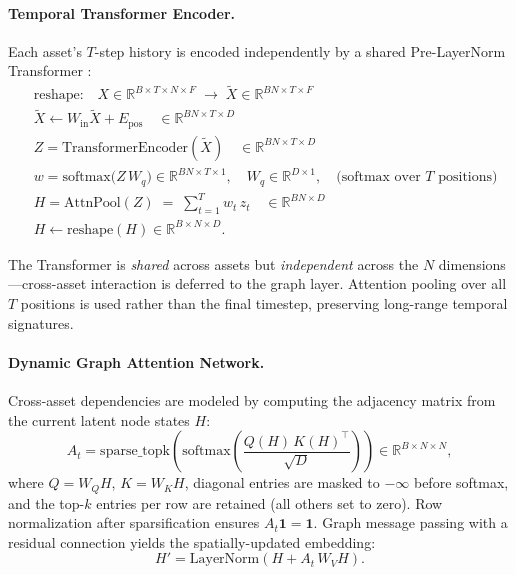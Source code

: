 \documentclass[11pt,a4paper]{article}
\begin{document}
\paragraph{Temporal Transformer Encoder.}
Each asset's $T$-step history is encoded independently by a shared
Pre-LayerNorm Transformer \citep{xiong2020prenorm}:
\begin{align}
  &\text{reshape:}\quad X \in \mathbb{R}^{B \times T \times N \times F}
    \;\to\; \tilde{X} \in \mathbb{R}^{BN \times T \times F}\\
  &\tilde{X} \gets W_{\mathrm{in}}\tilde{X} + E_{\mathrm{pos}}
    \quad \in \mathbb{R}^{BN \times T \times D}\\
  &Z = \mathrm{TransformerEncoder}(\tilde{X})
    \quad \in \mathbb{R}^{BN \times T \times D}\\
  &w = \mathrm{softmax}\!\bigl(Z\,W_q\bigr) \in \mathbb{R}^{BN \times T \times 1},
    \quad W_q \in \mathbb{R}^{D \times 1},\quad \text{(softmax over }T\text{ positions)}\\
  &H = \mathrm{AttnPool}(Z) \;=\; \sum_{t=1}^{T} w_t\, z_t
    \quad \in \mathbb{R}^{BN \times D}\\
  &H \gets \mathrm{reshape}(H) \in \mathbb{R}^{B \times N \times D}.
\end{align}

The Transformer is \emph{shared} across assets but \emph{independent} across
the $N$ dimensions—cross-asset interaction is deferred to the graph layer.
Attention pooling over all $T$ positions is used rather than the final
timestep, preserving long-range temporal signatures.

\paragraph{Dynamic Graph Attention Network.}
Cross-asset dependencies are modeled by computing the adjacency matrix from
the current latent node states $H$:
\begin{equation}
  A_t = \mathrm{sparse\_topk}\!\left(
    \mathrm{softmax}\!\left(\frac{Q(H)\,K(H)^\top}{\sqrt{D}}\right)
  \right) \in \mathbb{R}^{B \times N \times N},
\end{equation}
where $Q = W_Q H$, $K = W_K H$, diagonal entries are masked to $-\infty$
before softmax, and the top-$k$ entries per row are retained (all others set
to zero).  Row normalization after sparsification ensures $A_t \mathbf{1} = \mathbf{1}$.
Graph message passing with a residual connection yields the spatially-updated
embedding:
\begin{equation}
  H' = \mathrm{LayerNorm}(H + A_t \, W_V H).
\end{equation}
\end{document}
